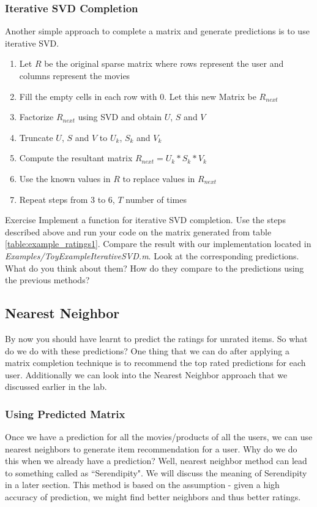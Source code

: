   \subsubsection{Iterative SVD Completion}
  Another simple approach to complete a matrix and generate predictions is to use iterative SVD. 
  \begin{enumerate}
    \item Let $R$ be the original sparse matrix where rows represent the user and columns represent the movies
    \item Fill the empty cells in each row with 0. Let this new Matrix be $R_{next}$
    \item Factorize $R_{next}$ using SVD and obtain $U$, $S$ and $V$
    \item Truncate $U$, $S$ and $V$ to $U_k$, $S_k$ and $V_k$
    \item Compute the resultant matrix $R_{next} = U_k*S_k*V_k$
    \item Use the known values in $R$ to replace values in $R_{next}$
    \item Repeat steps from $3$ to $6$, $T$ number of times
  \end{enumerate}
\begin{myremark}{Exercise }
Implement a function for iterative SVD completion. Use the steps described above and run your code on the matrix generated from table \ref{table:example_ratings1}. Compare the result with our implementation located in \textit{Examples/ToyExampleIterativeSVD.m}. Look at the corresponding predictions. What do you think about them? How do they compare to the predictions using the previous methods?
\end{myremark}
  \subsection{Nearest Neighbor}
  By now you should have learnt to predict the ratings for unrated items. So what do we do with these predictions? One thing that we can do after applying a matrix completion technique is to recommend the top rated predictions for each user. Additionally we can look into the Nearest Neighbor approach that we discussed earlier in the lab.
  \subsubsection{Using Predicted Matrix}
  Once we have a prediction for all the movies/products of all the users, we can use nearest neighbors to generate item recommendation for a user. Why do we do this when we already have a prediction? Well, nearest neighbor method can lead to something called as ``Serendipity". We will discuss the meaning of Serendipity in a later section. This method is based on the assumption - given a high accuracy of prediction, we might find better neighbors and thus better ratings.
